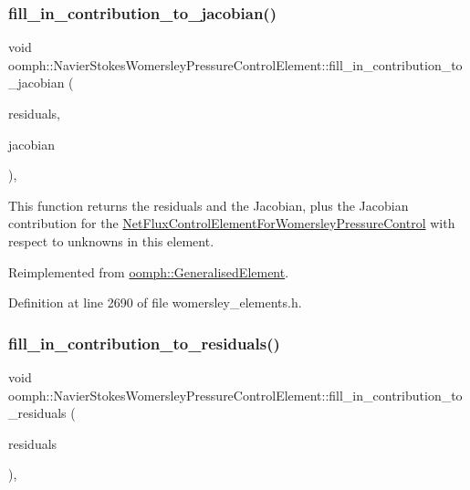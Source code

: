 \subsubsection{\texorpdfstring{fill\+\_\+in\+\_\+contribution\+\_\+to\+\_\+jacobian()}{fill\_in\_contribution\_to\_jacobian()}}
{\footnotesize\ttfamily void oomph\+::\+Navier\+Stokes\+Womersley\+Pressure\+Control\+Element\+::fill\+\_\+in\+\_\+contribution\+\_\+to\+\_\+jacobian (\begin{DoxyParamCaption}\item[{\hyperlink{classoomph_1_1Vector}{Vector}$<$ double $>$ \&}]{residuals,  }\item[{\hyperlink{classoomph_1_1DenseMatrix}{Dense\+Matrix}$<$ double $>$ \&}]{jacobian }\end{DoxyParamCaption})\hspace{0.3cm}{\ttfamily [inline]}, {\ttfamily [virtual]}}



This function returns the residuals and the Jacobian, plus the Jacobian contribution for the \hyperlink{classoomph_1_1NetFluxControlElementForWomersleyPressureControl}{Net\+Flux\+Control\+Element\+For\+Womersley\+Pressure\+Control} with respect to unknowns in this element. 



Reimplemented from \hyperlink{classoomph_1_1GeneralisedElement_a6ae09fc0d68e4309ac1b03583d252845}{oomph\+::\+Generalised\+Element}.



Definition at line 2690 of file womersley\+\_\+elements.\+h.

\mbox{\label{classoomph_1_1NavierStokesWomersleyPressureControlElement_a336e39637cd1405c5edefbcb4c9e26e8}} 
\subsubsection{\texorpdfstring{fill\+\_\+in\+\_\+contribution\+\_\+to\+\_\+residuals()}{fill\_in\_contribution\_to\_residuals()}}
{\footnotesize\ttfamily void oomph\+::\+Navier\+Stokes\+Womersley\+Pressure\+Control\+Element\+::fill\+\_\+in\+\_\+contribution\+\_\+to\+\_\+residuals (\begin{DoxyParamCaption}\item[{\hyperlink{classoomph_1_1Vector}{Vector}$<$ double $>$ \&}]{residuals }\end{DoxyParamCaption})\hspace{0.3cm}{\ttfamily [inline]}, {\ttfamily [virtual]}}




